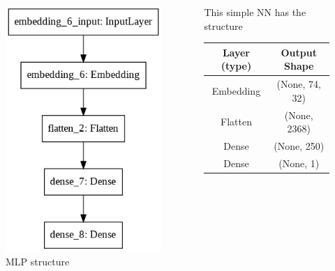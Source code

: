 \documentclass{beamer}
\begin{document}
\begin{frame}[fragile]
\begin{columns}
\begin{column}{0.5\textwidth}
\begin{figure}
    \centering
    \includegraphics[width=0.6\linewidth]{Figures/mlp_structure.png}
    \caption{MLP structure}
    \label{fig:mlp_struc}
\end{figure}
\end{column}
\begin{column}{0.5\textwidth}
This simple NN has the structure
\begin{table}[fontsize=\small]
    \centering
    \begin{tabular}{c|c}
    \hline
     Layer (type)&Output Shape\\
     \hline\hline
     Embedding&(None, 74, 32)\\
     \hline
     Flatten&(None, 2368)\\
     \hline
     Dense&(None, 250)\\
     \hline
     Dense&(None, 1)\\
     \hline\hline
\end{tabular}
\end{table}
\end{column}
\end{columns}
\end{frame}
\end{document}
